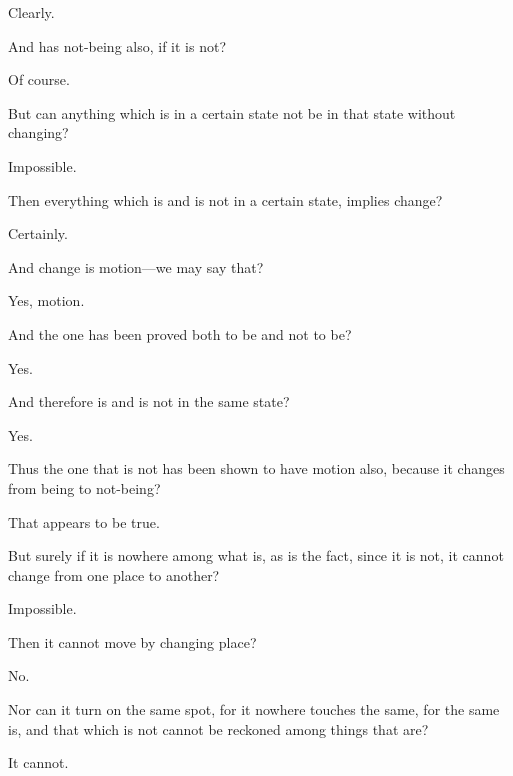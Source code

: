 \documentclass[11pt,letter]{article}
\begin{document}
\par  Clearly.

\par  And has not-being also, if it is not?

\par  Of course.

\par  But can anything which is in a certain state not be in that state without changing?

\par  Impossible.

\par  Then everything which is and is not in a certain state, implies change?

\par  Certainly.

\par  And change is motion—we may say that?

\par  Yes, motion.

\par  And the one has been proved both to be and not to be?

\par  Yes.

\par  And therefore is and is not in the same state?

\par  Yes.

\par  Thus the one that is not has been shown to have motion also, because it changes from being to not-being?

\par  That appears to be true.

\par  But surely if it is nowhere among what is, as is the fact, since it is not, it cannot change from one place to another?

\par  Impossible.

\par  Then it cannot move by changing place?

\par  No.

\par  Nor can it turn on the same spot, for it nowhere touches the same, for the same is, and that which is not cannot be reckoned among things that are?

\par  It cannot.
\end{document}
